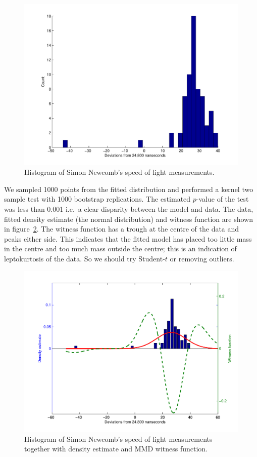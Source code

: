 \documentclass{article}
\def\ie{i.e.\ }
\begin{document}
\begin{figure}[ht]
\centering
\includegraphics[width=0.98\columnwidth]{figures/newcomb_hist}
\caption{
Histogram of Simon Newcomb's speed of light measurements.
}
\label{fig:newcomb_hist}
\end{figure}

We sampled 1000 points from the fitted distribution and performed a kernel two sample test with 1000 bootstrap replications.
The estimated $p$-value of the test was less than 0.001 \ie a clear disparity between the model and data.
The data, fitted density estimate (the normal distribution) and witness function are shown in figure~\ref{fig:newcomb_witness_1}.
The witness function has a trough at the centre of the data and peaks either side.
This indicates that the fitted model has placed too little mass in the centre and too much mass outside the centre; this is an indication of leptokurtosis of the data.
So we should try Student-$t$ or removing outliers.

\begin{figure}[ht]
\centering
\includegraphics[width=0.98\columnwidth]{figures/newcomb_witness_1}
\caption{
Histogram of Simon Newcomb's speed of light measurements together with density estimate and MMD witness function.
}
\label{fig:newcomb_witness_1}
\end{figure}
\end{document}
